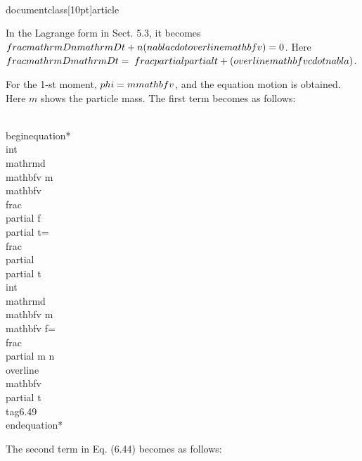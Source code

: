 \\documentclass[10pt]{article}
\begin{document}
{{{{In the Lagrange form in Sect. 5.3, it becomes $\\frac{\\mathrm{D} n}{\\mathrm{D} t}+n(\\nabla \\cdot \\overline{\\mathbf{v}})=0$. Here $\\frac{\\mathrm{D}}{\\mathrm{D} t}=$ $\\frac{\\partial}{\\partial t}+(\\overline{\\mathbf{v}} \\cdot \\nabla)$.

For the 1-st moment, $\\phi=m \\mathbf{v}$, and the equation motion is obtained. Here $m$ shows the particle mass. The first term becomes as follows:


\\begin{equation*}
\\int \\mathrm{d} \\mathbf{v} m \\mathbf{v} \\frac{\\partial f}{\\partial t}=\\frac{\\partial}{\\partial t} \\int \\mathrm{d} \\mathbf{v} m \\mathbf{v} f=\\frac{\\partial m n \\overline{\\mathbf{v}}}{\\partial t} \\tag{6.49}
\\end{equation*}


The second term in Eq. (6.44) becomes as follows:


}}}}
\end{document}
